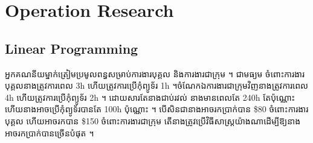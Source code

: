 




	
\chapter{Operation Research}

\section{Linear Programming}

\begin{exercise}
	អ្នកគណនីយម្នាក់ត្រៀមប្រមូលពន្ធសម្រាប់ការងារបុគ្គល និងការងារជាក្រុម ។
  ជាមធ្យម ចំពោះការងារបុគ្គលនាងត្រូវការពេល 3h ហើយត្រូវការប្រើកុំព្យូទ័រ 1h ។
  ​ចំណែកឯការងារជាក្រុមវិញនាងត្រូវការពេល 4h ហើយត្រូវការប្រើកុំព្យូទ័រ 2h ។
  ដោយសារតែនាងជាប់រវល់ នាងមានពេលតែ 240h តែប៉ុណ្ណោះ
  ហើយនាងអាចប្រើកុំព្យូទ័របានតែ 100h ប៉ុណ្ណោះ ។ បើសិនជានាងអាចរកប្រាក់បាន
  \$80 ចំពោះការងារបុគ្គល ហើយអាចរកបាន \$150 ចំពោះការងារជាក្រុម
  តើនាងត្រូវប្រើវិធីសាស្ត្រយ៉ាងណាដើម្បីឱ្យនាងអាចរកប្រាក់បានច្រើនបំផុត ។
\end{exercise}

